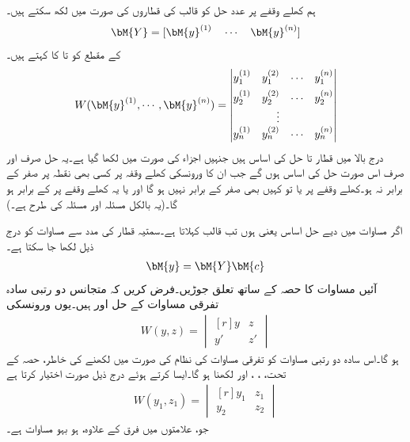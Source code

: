 ہم کھلے وقفے پر  عدد حل کو  قالب کی قطاروں کی صورت میں لکھ سکتے ہیں۔
\begin{align}\label{مساوات_نظام_ورونسکی_ب}
\bM{Y}=[\bM{y}^{(1)}\quad \cdots \quad \bM{y}^{(n)} ]
\end{align}
 کے  مقطع کو  تا  کا  کہتے ہیں۔
\begin{align}\label{مساوات_نظام_ورونسکی_پ}
W(\bM{y}^{(1)},\cdots,\bM{y}^{(n)})=
\begin{vmatrix*}[r]
y_1^{(1)}& y_1^{(2)} &\cdots&y_1^{(n)}\\[1ex]
y_2^{(1)}& y_2^{(2)} &\cdots&y_2^{(n)}\\
& \vdots & &\\
y_n^{(1)}& y_n^{(2)} &\cdots&y_n^{(n)}
\end{vmatrix*}
\end{align}
درج بالا  میں قطار   تا  حل کی اساس ہیں جنہیں اجزاء کی صورت میں لکھا گیا ہے۔یہ حل صرف اور صرف اس صورت حل کی اساس ہوں گے جب ان کا ورونسکی کھلے وقفہ  پر کسی بھی نقطہ  پر صفر کے برابر نہ ہو۔کھلے وقفے پر  یا تو کہیں بھی صفر کے برابر نہیں ہو گا اور یا یہ کھلے وقفے پر  کے برابر ہو گا۔(یہ بالکل مسئلہ  اور مسئلہ  کی طرح ہے۔)

اگر مساوات  میں دیے حل اساس یعنی   ہوں تب قالب   کہلاتا ہے۔سمتیہ قطار  کی مدد سے  مساوات  کو درج ذیل لکھا جا سکتا ہے۔
\begin{align}
\bM{y}=\bM{Y}\bM{c}
\end{align}
آئیں مساوات  کا حصہ  کے ساتھ تعلق جوڑیں۔فرض کریں کہ متجانس دو رتبی سادہ تفرقی مساوات کے حل  اور  ہیں۔یوں ورونسکی
\begin{align*}
W(y,z)=
\begin{vmatrix*}[r]
y&z\\
y'&z'
\end{vmatrix*}
\end{align*}
ہو گا۔اس سادہ دو رتبی مساوات کو تفرقی مساوات کی نظام کی صورت میں لکھنے کی خاطر، حصہ  کے تحت، ، ،  اور  لکھنا ہو گا۔ایسا کرتے ہوئے  درج ذیل صورت اختیار کرتا ہے
\begin{align*}
W(y_1,z_1)=
\begin{vmatrix*}[r]
y_1&z_1\\
y_2&z_2
\end{vmatrix*}
\end{align*}
جو، علامتوں میں فرق کے علاوہ، ہو بہو مساوات  ہے۔

